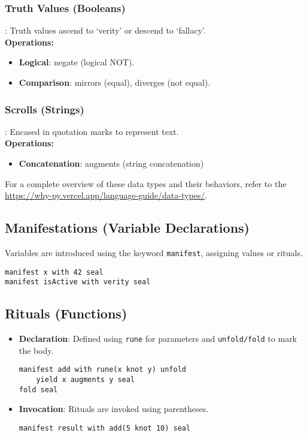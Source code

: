 \documentclass[11pt]{article}
\begin{document}
\subsubsection{Truth Values (Booleans)}: Truth values ascend to ‘verity’ or descend to ‘fallacy’. \\
\textbf{Operations:}
\begin{itemize}
    \item \textbf{Logical}: negate (logical NOT).
    \item \textbf{Comparison}: mirrors (equal), diverges (not equal).
\end{itemize}

\subsubsection{Scrolls (Strings)}: Encased in quotation marks to represent text. \\
\textbf{Operations:}
\begin{itemize}
    \item \textbf{Concatenation}: augments (string concatenation)
\end{itemize}

For a complete overview of these data types and their behaviors, refer to the \url{https://why-py.vercel.app/language-guide/data-types/}.

\subsection{Manifestations (Variable Declarations)}
Variables are introduced using the keyword \texttt{manifest}, assigning values or rituals.
\begin{lstlisting}
manifest x with 42 seal
manifest isActive with verity seal
\end{lstlisting}

\subsection{Rituals (Functions)}
\begin{itemize}
    \item \textbf{Declaration}: Defined using \texttt{rune} for parameters and \texttt{unfold/fold} to mark the body.
    \begin{lstlisting}
manifest add with rune(x knot y) unfold
    yield x augments y seal
fold seal
    \end{lstlisting}
    \item \textbf{Invocation}: Rituals are invoked using parentheses.
    \begin{lstlisting}
manifest result with add(5 knot 10) seal
    \end{lstlisting}
\end{itemize}
\end{document}
